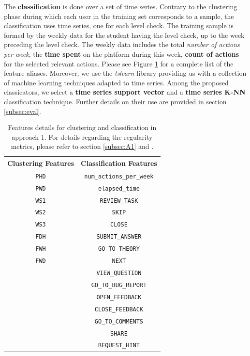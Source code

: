 \documentclass[sigplan,screen]{acmart}
\begin{document}
The \textbf{classification} is done over a set of time series. Contrary to the clustering phase during which each user in the training set corresponds to a sample, the classification uses time series, one for each level check. The training sample is formed by the weekly data for the student having the level check, up to the week preceding the level check. The weekly data includes the total \textit{number of actions per week}, the \textbf{time spent} on the platform during this week, \textbf{count of actions} for the selected relevant actions. Please see Figure \ref{tab:A1_feature_vectors} for a complete list of the feature aliases. Moreover, we use the \emph{tslearn}\cite{tslearn} library providing us with a collection of machine learning techniques adapted to time series. Among the proposed classicators, we select a \textbf{time series support vector} and a \textbf{time series K-NN} classification technique. Further details on their use are provided in section \ref{subsec:eval}.

\begin{table}[h]
    \centering
    \caption{Features details for clustering and classification in approach 1. For details regarding the regularity metrics, please refer to section \ref{subsec:A1} and \cite{quantifyreg}.}
    \begin{tabular}{|c|c|}
    \hline
        Clustering Features & Classification Features \\ \hline
        \texttt{PHD} & \texttt{num\_actions\_per\_week} \\ 
        \texttt{PWD} & \texttt{elapsed\_time} \\
        \texttt{WS1} & \texttt{REVIEW\_TASK} \\ 
        \texttt{WS2} &\texttt{SKIP} \\ 
        \texttt{WS3} &\texttt{CLOSE} \\ 
        \texttt{FDH} &\texttt{SUBMIT\_ANSWER} \\ 
        \texttt{FWH} &\texttt{GO\_TO\_THEORY} \\ 
        \texttt{FWD} &\texttt{NEXT} \\ 
        &\texttt{VIEW\_QUESTION} \\ 
        &\texttt{GO\_TO\_BUG\_REPORT} \\ 
        &\texttt{OPEN\_FEEDBACK} \\ 
        &\texttt{CLOSE\_FEEDBACK} \\ 
        &\texttt{GO\_TO\_COMMENTS} \\ 
        &\texttt{SHARE} \\ 
        &\texttt{REQUEST\_HINT} \\ \hline
    \end{tabular}
    \label{tab:A1_feature_vectors}
\end{table}
\end{document}
